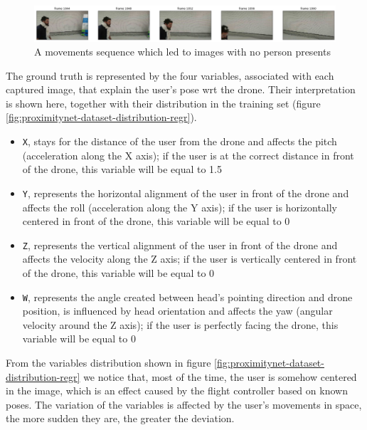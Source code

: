 \begin{figure}[!htb]
\centering
\includegraphics[width=1\textwidth]{"contents/images/03-data-missing"}
\caption[A movements sequence which led to images with no person presents]{A movements sequence which led to images with no person presents}
\label{fig:proximitynet-dataset-missing}
\end{figure}

The ground truth is represented by the four variables, associated with each captured image, that explain the user's pose \gls{wrt} the drone. Their interpretation is shown here, together with their distribution in the training set (figure \ref{fig:proximitynet-dataset-distribution-regr}).

\begin{itemize}
	\item \texttt{X}, stays for the distance of the user from the drone and affects the pitch (acceleration along the X axis); if the user is at the correct distance in front of the drone, this variable will be equal to 1.5
	\item \texttt{Y}, represents the horizontal alignment of the user in front of the drone and affects the roll (acceleration along the Y axis); if the user is horizontally centered in front of the drone, this variable will be equal to 0
	\item \texttt{Z}, represents the vertical alignment of the user in front of the drone and affects the velocity along the Z axis; if the user is vertically centered in front of the drone, this variable will be equal to 0
	\item \texttt{W}, represents the angle created between head's pointing direction and drone position, is influenced by head orientation and affects the yaw (angular velocity around the Z axis); if the user is perfectly facing the drone, this variable will be equal to 0
\end{itemize}

From the variables distribution shown in figure \ref{fig:proximitynet-dataset-distribution-regr} we notice that, most of the time, the user is somehow centered in the image, which is an effect caused by the flight controller based on known poses. The variation of the variables is affected by the user's movements in space, the more sudden they are, the greater the deviation.

